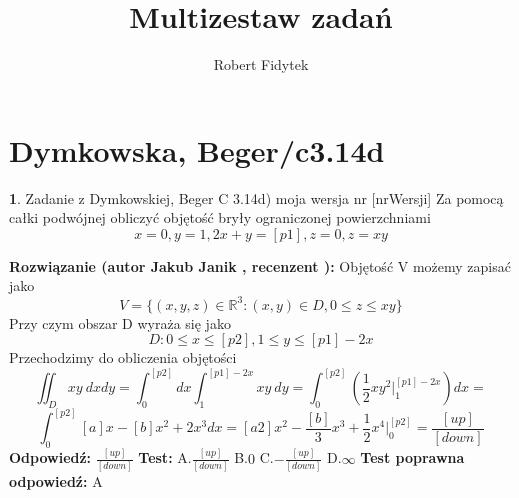 \documentclass[12pt, a4paper]{article}
\title{Multizestaw zadań}
\author{Robert Fidytek}
\date{}
\theoremstyle{definition} %
\newtheorem{zad}{}
\newcommand{\kategoria}[1]{\section{#1}} %
\newcommand{\zadStart}[1]{\begin{zad}#1\newline} %
\newcommand{\zadStop}{\end{zad}}   %
\newcommand{\rozwStart}[2]{\noindent \textbf{Rozwiązanie (autor #1 , recenzent #2): }\newline} %
\newcommand{\rozwStop}{\newline}                                            %
\newcommand{\odpStart}{\noindent \textbf{Odpowiedź:}\newline}    %
\newcommand{\odpStop}{\newline}                                             %
\newcommand{\testStart}{\noindent \textbf{Test:}\newline} %
\newcommand{\testStop}{\newline} %
\newcommand{\kluczStart}{\noindent \textbf{Test poprawna odpowiedź:}\newline} %
\newcommand{\kluczStop}{\newline} %
\begin{document}
\maketitle


\kategoria{Dymkowska, Beger/c3.14d}
\zadStart{Zadanie z Dymkowskiej, Beger C 3.14d) moja wersja nr [nrWersji]}
Za pomocą całki podwójnej obliczyć objętość bryły ograniczonej powierzchniami $$x=0, y=1, 2x+y=[p1], z=0, z=xy$$
\zadStop
\rozwStart{Jakub Janik}{}
Objętość V możemy zapisać jako
$$V=\{(x,y,z)\in\mathbb{R}^3\colon(x,y)\in D, 0 \leq z \leq xy\}$$
Przy czym obszar D wyraża się jako
$$D\colon 0 \leq x \leq [p2], 1 \leq y \leq [p1]-2x$$
Przechodzimy do obliczenia objętości
$$\iint_D xy\ dxdy=\int_0^{[p2]}dx\int_1^{[p1]-2x}xy\ dy=\int_0^{[p2]}(\frac{1}{2}xy^2\Big|_1^{[p1]-2x})dx=$$
$$\int_0^{[p2]}[a]x-[b]x^2+2x^3dx=[a2]x^2-\frac{[b]}{3}x^3+\frac{1}{2}x^4\Big|_0^{[p2]}=\frac{[up]}{[down]}$$
\rozwStop
\odpStart
$\frac{[up]}{[down]}$
\odpStop
\testStart
A.$\frac{[up]}{[down]}$
B.$0$
C.$-\frac{[up]}{[down]}$
D.$\infty$
\testStop
\kluczStart
A
\kluczStop
\end{document}
